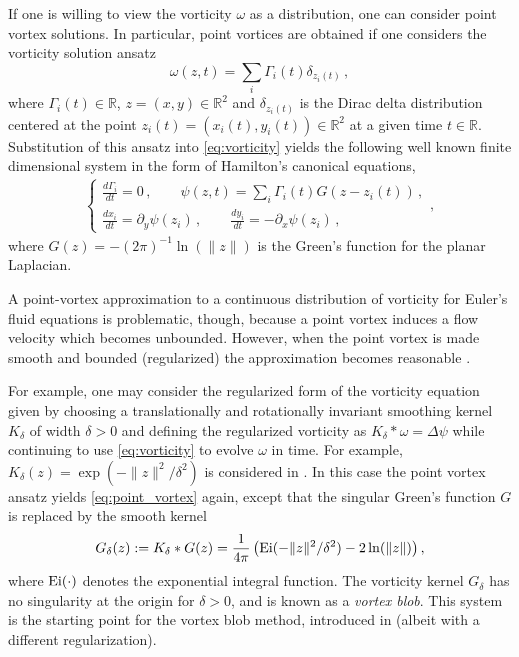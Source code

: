 \documentclass[12pt]{amsart}
\theoremstyle{remark}
\begin{document}
If one is willing to view the vorticity $\omega$ as a distribution, one can consider point vortex solutions.
In particular, point vortices are obtained if one considers the vorticity solution ansatz 
\[\omega(z,t) = \sum_{i} \Gamma_i(t) \delta_{z_i(t)}\,,\]
where $\Gamma_i(t) \in \mathbb{R}$, $z=(x,y) \in \mathbb{R}^2$ and $\delta_{z_i(t)}$ is the Dirac delta distribution centered at the point $z_i(t) = (x_i(t),y_i(t)) \in \mathbb{R}^2$
at a given time $t \in \mathbb{R}$.
Substitution of this ansatz into \eqref{eq:vorticity} yields the following well known finite dimensional system in the form  of Hamilton's canonical equations,
\begin{align}
\begin{cases}
	\frac{d \Gamma_i}{dt} = 0 \,,\quad  \quad \psi(z,t) = \sum_i  \Gamma_i(t) G(z-z_i(t)) \,, \\
	\frac{dx_i}{dt} = \partial_y \psi(z_i) \,,\quad  \quad \frac{dy_i}{dt} = - \partial_x \psi(z_i)\,,
\end{cases} \label{eq:point_vortex},
\end{align}
where $G(z) =  - (2\pi)^{-1} \ln( \| z \|)$ is the Green's function for the planar Laplacian. 

A point-vortex approximation to a continuous distribution of vorticity for Euler's fluid equations is problematic, though, because a point vortex induces a flow velocity which becomes unbounded. However, when the point vortex is made smooth and bounded (regularized) the approximation becomes reasonable  \cite{Chorin1973}.

For example, one may consider the regularized form of the vorticity equation given by
choosing a translationally and rotationally invariant smoothing kernel $K_\delta$ of width $\delta > 0$ and defining the regularized vorticity as 
$K_\delta* \omega = \Delta \psi$ while continuing to use \eqref{eq:vorticity} to evolve $\omega$ in time.
For example, $K_\delta (z) = \exp( - \| z\|^2 / \delta^2)$ is considered in \cite{BealeMajda1985}.
In this case the point vortex ansatz yields \eqref{eq:point_vortex} again, except that the singular Green's function $G$ is replaced by the smooth kernel
\begin{align}
	G_\delta(z) := K_\delta*G(z) = \frac{1}{4\pi} \left( {\rm Ei}(- \| z \|^2 / \delta^2) - 2\ln ( \| z \|) \right), \label{eq:kernel}
\end{align}
where ${\rm Ei}( \cdot )$ denotes the exponential integral function.
The vorticity kernel $G_\delta$ has no singularity at the origin for $\delta > 0$, and is known as a \textit{vortex blob}.
This system is the starting point for the vortex blob method, introduced in \cite{Chorin1973} (albeit with a different regularization).
\end{document}
